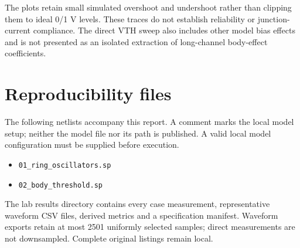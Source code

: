 The plots retain small simulated overshoot and undershoot rather than clipping them to ideal 0/1 V levels. These traces do not establish reliability or junction-current compliance. The direct VTH sweep also includes other model bias effects and is not presented as an isolated extraction of long-channel body-effect coefficients.

\section{Reproducibility files}
The following netlists accompany this report. A comment marks the local model setup; neither the model file nor its path is published. A valid local model configuration must be supplied before execution.
\begin{itemize}
\item \texttt{01\_ring\_oscillators.sp}
\item \texttt{02\_body\_threshold.sp}
\end{itemize}
The lab results directory contains every case measurement, representative waveform CSV files, derived metrics and a specification manifest. Waveform exports retain at most 2501 uniformly selected samples; direct measurements are not downsampled. Complete original listings remain local.

